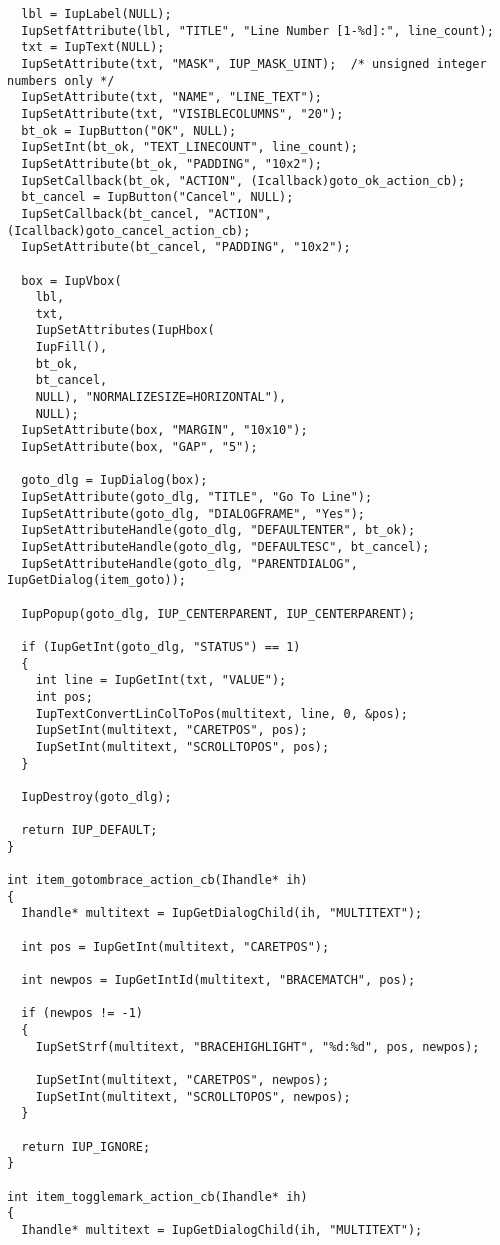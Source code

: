 \documentclass{ctexart}
\begin{document}
\begin{lstlisting}
  lbl = IupLabel(NULL);
  IupSetfAttribute(lbl, "TITLE", "Line Number [1-%d]:", line_count);
  txt = IupText(NULL);
  IupSetAttribute(txt, "MASK", IUP_MASK_UINT);  /* unsigned integer numbers only */
  IupSetAttribute(txt, "NAME", "LINE_TEXT");
  IupSetAttribute(txt, "VISIBLECOLUMNS", "20");
  bt_ok = IupButton("OK", NULL);
  IupSetInt(bt_ok, "TEXT_LINECOUNT", line_count);
  IupSetAttribute(bt_ok, "PADDING", "10x2");
  IupSetCallback(bt_ok, "ACTION", (Icallback)goto_ok_action_cb);
  bt_cancel = IupButton("Cancel", NULL);
  IupSetCallback(bt_cancel, "ACTION", (Icallback)goto_cancel_action_cb);
  IupSetAttribute(bt_cancel, "PADDING", "10x2");

  box = IupVbox(
    lbl,
    txt,
    IupSetAttributes(IupHbox(
    IupFill(),
    bt_ok,
    bt_cancel,
    NULL), "NORMALIZESIZE=HORIZONTAL"),
    NULL);
  IupSetAttribute(box, "MARGIN", "10x10");
  IupSetAttribute(box, "GAP", "5");

  goto_dlg = IupDialog(box);
  IupSetAttribute(goto_dlg, "TITLE", "Go To Line");
  IupSetAttribute(goto_dlg, "DIALOGFRAME", "Yes");
  IupSetAttributeHandle(goto_dlg, "DEFAULTENTER", bt_ok);
  IupSetAttributeHandle(goto_dlg, "DEFAULTESC", bt_cancel);
  IupSetAttributeHandle(goto_dlg, "PARENTDIALOG", IupGetDialog(item_goto));

  IupPopup(goto_dlg, IUP_CENTERPARENT, IUP_CENTERPARENT);

  if (IupGetInt(goto_dlg, "STATUS") == 1)
  {
    int line = IupGetInt(txt, "VALUE");
    int pos;
    IupTextConvertLinColToPos(multitext, line, 0, &pos);
    IupSetInt(multitext, "CARETPOS", pos);
    IupSetInt(multitext, "SCROLLTOPOS", pos);
  }

  IupDestroy(goto_dlg);

  return IUP_DEFAULT;
}

int item_gotombrace_action_cb(Ihandle* ih)
{
  Ihandle* multitext = IupGetDialogChild(ih, "MULTITEXT");

  int pos = IupGetInt(multitext, "CARETPOS");

  int newpos = IupGetIntId(multitext, "BRACEMATCH", pos);

  if (newpos != -1)
  {
    IupSetStrf(multitext, "BRACEHIGHLIGHT", "%d:%d", pos, newpos);

    IupSetInt(multitext, "CARETPOS", newpos);
    IupSetInt(multitext, "SCROLLTOPOS", newpos);
  }

  return IUP_IGNORE;
}

int item_togglemark_action_cb(Ihandle* ih)
{
  Ihandle* multitext = IupGetDialogChild(ih, "MULTITEXT");


\end{lstlisting}
\end{document}
